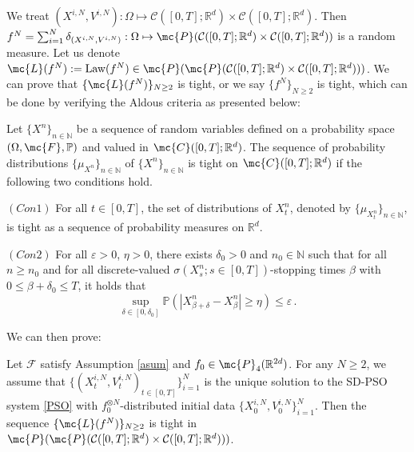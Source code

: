 \documentclass{ims9x6}
\newcommand{\CR}{\mathcal{C}([0,T];\mathbb{R}^d)}
\newcommand{\TE}{\mathcal{F}}
\newcommand{\RR}{\mathbb{R}}
\newcommand{\NN}{\mathbb{N}}
\newcommand{\PP}{\mathbb{P}}
\begin{document}
We treat $(X^{i,N},V^{i,N}): \Omega\mapsto \CR\times \CR$. Then
$f^N=\sum_{i=1}^{N}\delta_{(X^{i,N},V^{i,N})}: \Omega\mapsto \mc{P}(\CR\times\CR)$ is a random measure. Let us denote $\mc{L}(f^N):=\mbox{Law}(f^N)\in \mc{P}(\mc{P}(\CR\times\CR))$.  We can prove that $\{\mc{L}(f^N)\}_{N\geq 2}$ is tight, or  we say
$\{f^N\}_{N\geq2}$ is tight, which can be done by verifying the Aldous criteria \cite{billingsley2013convergence} as presented below:
	\begin{lemma}\label{lemAldous}
	Let $\{X^n\}_{n\in \NN}$ be a sequence of random variables defined on a probability space $(\Omega,\mc{F},\PP)$ and valued in $\mc{C}([0,T];\RR^d)$. The sequence of probability distributions $\{\mu_{X^n}\}_{n\in \NN}$  of $\{X^n\}_{n\in \NN}$ is tight on $\mc{C}([0,T];\RR^d)$ if the following two conditions hold.
	
	$(Con 1)$ For all $t\in [0,T]$, the set of distributions of $X_t^n$, denoted by $\{\mu_{X_t^n}\}_{n\in\NN}$, is tight as a sequence of probability measures on $\RR^d$.
	
	$(Con 2)$ For all $\varepsilon>0$, $\eta>0$, there exists $\delta_0>0$ and $n_0\in\NN$ such that for all $n\geq n_0$ and for all discrete-valued $\sigma(X^n_s;s\in[0,T])$-stopping times $\beta$ with $0\leq \beta+\delta_0\leq T$, it holds that
	\begin{equation}
	\sup_{\delta\in[0,\delta_0]}\PP\left(|X^n_{\beta+\delta}-X^n_{\beta}|\geq \eta\right)\leq \varepsilon\,.
	\end{equation}
\end{lemma}
We can then prove:
\begin{theorem}\label{thmtight}
	Let $\TE$ satisfy Assumption \ref{asum} and $f_0\in \mc{P}_4(\RR^{2d})$. For any $N\geq 2$, we assume that $\{(X_t^{i,N},V_t^{i,N})_{t\in[0,T]}\}_{i=1}^N$ is the unique solution to the SD-PSO system \eqref{PSO} with $f_0^{\otimes N}$-distributed initial data $\{X_0^{i,N},V_0^{i,N}\}_{i=1}^N$. Then the sequence $\{\mc{L}(f^N)\}_{N\geq 2}$ is tight in $\mc{P}(\mc{P}(\CR\times\CR))$.
\end{theorem}
\end{document}
